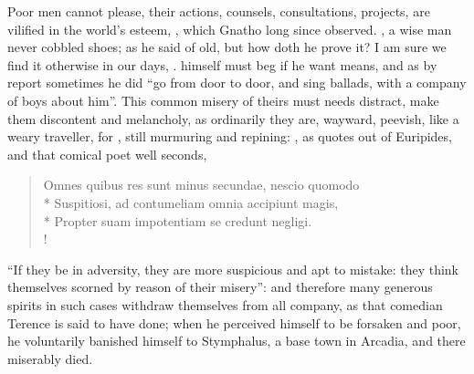 Poor men cannot please, their actions, counsels, consultations, projects, are
vilified in the world's esteem, , which Gnatho
long since observed. , a wise man never cobbled shoes; as he said of old, but how doth
he prove it? I am sure we find it otherwise in our days,
. \Homer{} himself must
beg if he want means, and as by report sometimes he did
\enquote{go from door to door, and sing ballads, with a company of
boys about him}. This common misery of theirs must needs distract, make them
discontent and melancholy, as ordinarily they are, wayward, peevish, like a
weary traveller, for , still murmuring and repining: , as \Plutarch{} quotes out of Euripides, and that comical poet well seconds,

\begin{latin}
\begin{verse}%
Omnes quibus res sunt minus secundae, nescio quomodo\\*
Suspitiosi, ad contumeliam omnia accipiunt magis,\\*
Propter suam impotentiam se credunt negligi.\\!
\end{verse}%
\end{latin}

\enquote{If they be in adversity, they are more suspicious and apt to mistake: they
think themselves scorned by reason of their misery}: and therefore many
generous spirits in such cases withdraw themselves from all company, as that
comedian Terence is said to have done; when he perceived
himself to be forsaken and poor, he voluntarily banished himself to Stymphalus,
a base town in Arcadia, and there miserably died.


